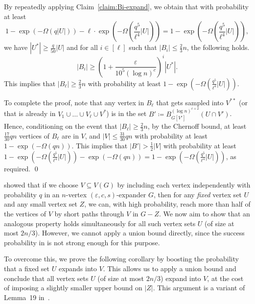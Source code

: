 \documentclass[10pt]{article}
\theoremstyle{plain}
\numberwithin{theorem}{section}
\theoremstyle{definition}
\theoremstyle{remark}
\renewenvironment{proof}[1][]{\begin{trivlist}
\item[\hspace{\labelsep}{\bf\noindent Proof#1.\/}] }{\qed\end{trivlist}}
\newcommand{\eps}{\varepsilon}
\theoremstyle{plain}
\begin{document}
\begin{proof}
			By repeatedly applying Claim~\ref{claim:Bi-expand}, we obtain that with probability at least 
			\begin{equation*}
				1 - \exp\left(-\Omega(q|U|)\right) - \ell \cdot \exp\left(-\Omega\left(\frac{q^5}{\ell^4}|U|\right)\right) = 
				1 - \exp\left(-\Omega\left(\frac{q^5}{\ell^4}|U|\right)\right),
			\end{equation*}
			we have $|U^*| \ge \frac{q}{50}|U|$ and for all $i \in [\ell]$ such that $|B_i| \le \frac{2}{3}n$, the following holds.
			\begin{equation*}
				|B_i| \ge \left(1 + \frac{\eps}{10^5 (\log n)^c}\right)^i |U^*|.
			\end{equation*}
			This implies that $|B_{\ell}| \ge \frac{2}{3}n$ with probability at least $1 - \exp\left(-\Omega\left(\frac{q^5}{\ell^4}|U|\right)\right)$.

			To complete the proof, note that any vertex in $B_{\ell}$ that gets sampled into $V^{**}$ (or that is already in $V_1 \cup \ldots \cup V_{\ell} \cup V^*$) is in the set $B' \coloneqq B_{G[V']}^{(\log n)^{c+2}}(U \cap V')$. 
   Hence, conditioning on the event that $|B_{\ell}| \ge \frac{2}{3}n$,
   by the Chernoff bound, at least $\frac{17}{30} qn$ vertices of $B_{\ell}$ are in $V$, and $|V| \le \frac{31}{30}qn$ with probability at least $1 - \exp({-\Omega(qn)})$. This implies that $|B'| > \frac{1}{2}|V|$ with probability at least $1 - \exp\left(-\Omega\left(\frac{q^5}{\ell^4}|U|\right)\right) - \exp({-\Omega(qn)}) = 1 - \exp\left(-\Omega\left(\frac{q^5}{\ell^4}|U|\right)\right)$, as required.
		\end{proof}


 showed that if we choose $V\subseteq V(G)$ by including each vertex independently with probability $q$ in an $n$-vertex $(\varepsilon,c, s)$-expander $G$, then for any \emph{fixed} vertex set $U$ and any small vertex set $Z$, we can, with high probability, reach more than half of the vertices of $V$ by short paths through $V$ in $G-Z$. We now aim to show that an analogous property holds simultaneously for all such vertex sets $U$ (of size at most $2n/3$). However, we cannot apply a union bound directly, since the success probability in  is not strong enough for this purpose.

To overcome this, we prove the following corollary by boosting the probability that a fixed set $U$ expands into $V$. This allows us to apply a union bound and conclude that all vertex sets $U$ (of size at most $2n/3$) expand into $V$, at the cost of imposing a slightly smaller upper bound on $|Z|$. This argument is a variant of Lemma~19 in~\cite{bucic2022erdos}. 
\end{document}
